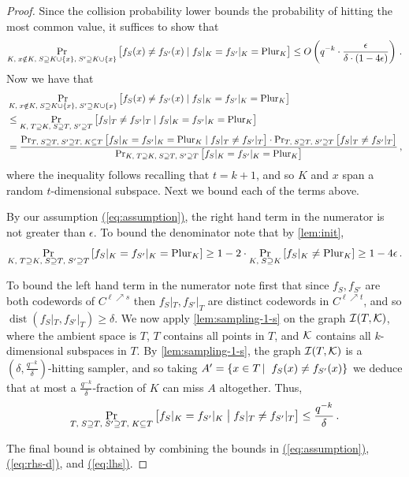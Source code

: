 \documentclass{toc}
\renewcommand{\eqref}[1]{\hyperref[#1]{(\ref*{#1})}}
\theoremstyle{plain}
\DeclareMathOperator{\dist}{dist} %
\newcommand{\calI}{{\mathcal{I}}}
\newcommand{\pl}{{\rm{Plur}}}
\newcommand\sett[2]{\left\{ #1 \left| \; \vphantom{#1 #2} \right. #2  \right\}}
\begin{document}
\begin{proof}
Since the collision probability lower bounds the probability of hitting the most common value, it suffices to show that
\[ \Pr_{K,\; x \notin K, \;S \supseteq K \cup \{x\}, \;S' \supseteq K \cup \{x\}} \big[f_S(x) \neq f_{S'}(x) \mid f_S|_K =  f_{S'}|_K = \pl_K \big]  \leq O\left(  q^{-k} \cdot \frac{\epsilon} {\delta \cdot (1-4\epsilon)}\right)\,.\]
Now we have that
\begin{align*}
 &\Pr_{K, \;x\notin K,\;S \supseteq K \cup \{x\}, \;S' \supseteq K \cup \{x\}} \big[f_S(x) \neq f_{S'}(x) \mid f_S|_K =  f_{S'}|_K = \pl_K \big] \\
&\leq  \Pr_{K, \;T\supseteq K,\;S \supseteq T, \;S' \supseteq T} \big[f_S|_{T} \neq f_{S'}|_{T} \mid f_S|_K =  f_{S'}|_K = \pl_K \big] \\
& = \frac{ \Pr_{T, \;S \supseteq T, \;S' \supseteq T, \;K\subseteq T} \big[ f_S|_K =  f_{S'}|_K = \pl_{K}  \mid f_S|_{T} \neq f_{S'}|_{T} \big]  \cdot \Pr_{T,\;S \supseteq T, \;S' \supseteq T} \big[  f_S|_{T} \neq f_{S'}|_{T} \big]} {\Pr_{K, \;T\supseteq K,\;S \supseteq T, \;S' \supseteq T} \big[ f_S|_K =  f_{S'}|_{K}  = \pl_K \big] }\,, \\
\end{align*}
where the inequality follows recalling that $t=k+1$, and so $K$ and $x$ span a random $t$-dimensional subspace.
Next we bound each of the terms above.

By our assumption \eqref{eq:assumption},  the right hand term in the numerator is %
not greater than   %
$\epsilon$. To bound the denominator note that by \cref{lem:init},
\begin{equation}\label{eq:rhs-d}
\Pr_{K, \;T\supseteq K,\;S \supseteq T, \;S' \supseteq T} \left[ f_S|_K =  f_{S'}|_{K}  = \pl_K \right]  \geq  1- 2\cdot \Pr_{K, \;S \supseteq K} \left[ f_S|_K \neq \pl_K \right] \geq 1-4\epsilon\,.
\end{equation}

%
To bound the left hand term in the numerator note first that since $f_{S}, f_{S'} $ are both codewords of  $C^{\ell \nearrow s}$ then $f_{S}|_T, f_{S'}|_T$ are distinct codewords in $C^{\ell \nearrow t}$, and so
 $\dist(f_S|_T, f_{S'}|_T) \geq \delta$.
We now apply \cref{lem:sampling-1-s} on the graph $\calI(T, \cal K)$, where the ambient space is $T$,  $T$ contains all points in $T$, and $\cal K$ contains all $k$-dimensional subspaces in $T$. By \cref{lem:sampling-1-s}, the graph $\calI ( T, \cal K)$ is a $(\delta, \frac {q^{-k}} {\delta})$-hitting sampler, and so taking
$ A'=\sett{x\in T}{f_S(x)\neq f_{S'}(x)}$
we deduce that at most a $\frac{q^{-k}} \delta$-fraction of $K$ can miss $A$
altogether. Thus,
 \begin{equation}\label{eq:lhs}
 \Pr_{T, \;S \supseteq T, \;S' \supseteq T, \;K \subseteq T} \left[ f_S|_K =  f_{S'}|_K  \bigm| f_S|_{T} \neq f_{S'}|_{T} \right]  \leq \frac{q^{-k}} {\delta} \,.
 \end{equation}

 The final bound is obtained by combining the bounds in \eqref{eq:assumption}, \eqref{eq:rhs-d}, and \eqref{eq:lhs}.
\end{proof}
\end{document}
